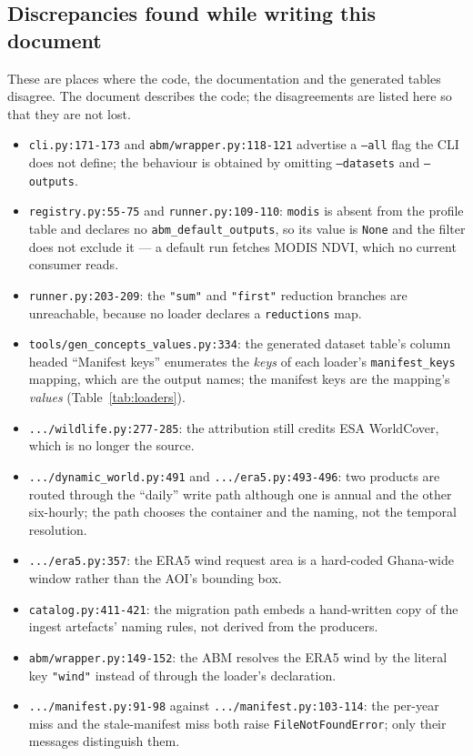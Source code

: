 \documentclass[11pt,a4paper]{article}
\newcommand{\code}[1]{\texttt{#1}}
\begin{document}
\subsection{Discrepancies found while writing this document}
\label{sec:discrepancies}

These are places where the code, the documentation and the generated tables
disagree. The document describes the code; the disagreements are listed here
so that they are not lost.

\begin{itemize}
\item \code{cli.py:171-173} and \code{abm/wrapper.py:118-121} advertise a
\code{--all} flag the CLI does not define; the behaviour is obtained by
omitting \code{--datasets} and \code{--outputs}.
\item \code{registry.py:55-75} and \code{runner.py:109-110}: \code{modis} is
absent from the profile table and declares no \code{abm\_default\_outputs},
so its value is \code{None} and the filter does not exclude it --- a default
run fetches MODIS NDVI, which no current consumer reads.
\item \code{runner.py:203-209}: the \code{"sum"} and \code{"first"} reduction
branches are unreachable, because no loader declares a \code{reductions} map.
\item \code{tools/gen\_concepts\_values.py:334}: the generated dataset
table's column headed ``Manifest keys'' enumerates the \emph{keys} of each
loader's \code{manifest\_keys} mapping, which are the output names; the
manifest keys are the mapping's \emph{values} (Table~\ref{tab:loaders}).
\item \code{.../wildlife.py:277-285}: the attribution still credits ESA
WorldCover, which is no longer the source.
\item \code{.../dynamic\_world.py:491} and \code{.../era5.py:493-496}: two
products are routed through the ``daily'' write path although one is annual
and the other six-hourly; the path chooses the container and the naming, not
the temporal resolution.
\item \code{.../era5.py:357}: the ERA5 wind request area is a hard-coded
Ghana-wide window rather than the AOI's bounding box.
\item \code{catalog.py:411-421}: the migration path embeds a hand-written
copy of the ingest artefacts' naming rules, not derived from the producers.
\item \code{abm/wrapper.py:149-152}: the ABM resolves the ERA5 wind by the
literal key \code{"wind"} instead of through the loader's declaration.
\item \code{.../manifest.py:91-98} against \code{.../manifest.py:103-114}: the
per-year miss and the stale-manifest miss both raise
\code{FileNotFoundError}; only their messages distinguish them.
\end{itemize}
\end{document}

